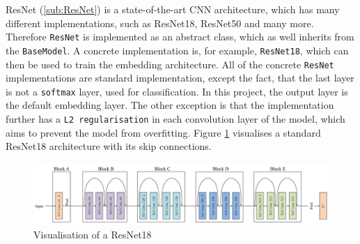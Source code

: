 \Gls{ResNet} (\ref{sub:ResNet}) is a state-of-the-art \gls{CNN} architecture, which has many different implementations, such as ResNet18, ResNet50 and many more. Therefore \texttt{ResNet} is implemented as an abstract class, which as well inherits from the \texttt{BaseModel}. A concrete implementation is, for example, \texttt{ResNet18}, which can then be used to train the embedding architecture. All of the concrete \texttt{ResNet} implementations are standard implementation, except the fact, that the last layer is not a \texttt{softmax} layer, used for classification. In this project, the output layer is the default embedding layer. The other exception is that the implementation further has a \texttt{L2 regularisation} in each convolution layer of the model, which aims to prevent the model from overfitting. Figure \ref{fig:ResNet18} visualises a standard ResNet18 architecture with its skip connections.
\begin{figure}[htbp]
	\centering
	\includegraphics[width=\linewidth]{img/ResNet18.png}
	\caption[Visualisation of a ResNet18]{Visualisation of a ResNet18\footnotemark}
	\label{fig:ResNet18}
\end{figure}

